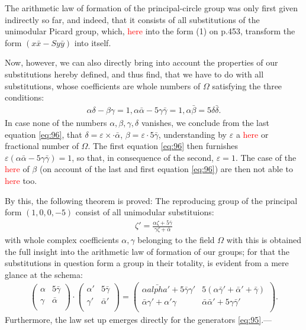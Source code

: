 The arithmetic law of formation of the principal-circle group was only first given indirectly so far, and indeed, that it consists of all substitutions of the unimodular Picard group, which, \textcolor{red}{here} into the form (1) on p.453, transform the form $(x\bar{x}-Sy\bar{y})$ into itself.

Now, however, we can also directly bring into account the properties of our substitutions hereby defined, and thus find, that we have to do with all substitutions, whose coefficients are whole numbers of $\Omega$ satisfying the three conditions:
\begin{align}\label{eq:96}
    \alpha\delta-\beta\gamma=1, \alpha\bar{\alpha}-5\gamma\bar{\gamma}=1, \alpha\bar{\beta}=5\delta\bar{\delta}.
\end{align}
In case none of the numbers $\alpha, \beta, \gamma, \delta$ vanishes, we conclude from the last equation \ref{eq:96}, that $\delta=\varepsilon\times\cdot\bar{\alpha}$, $\beta=\varepsilon\cdot 5 \bar{\gamma}$, understanding by $\varepsilon$ a \textcolor{red}{here} or fractional number of $\Omega$. The first equation \ref{eq:96} then furnishes $\varepsilon(\alpha\bar{\alpha}-5\gamma\bar{\gamma})=1$, so that, in consequence of the second, $\varepsilon=1$. The case of the \textcolor{red}{here} of $\beta$ (on account of the last and first equation \ref{eq:96}) are then not able to \textcolor{red}{here} too.
 
By this, the following theorem is proved: The reproducing group of the principal form $(1,0,0,-5)$ consist of all unimodular substituions:
\begin{align}
    \zeta'=\frac{\alpha\zeta+5\bar{\gamma}}{\gamma\zeta+\bar{\alpha}}
   \end{align} 
with whole complex coefficients $\alpha, \gamma$ belonging to the field $\Omega$ with this is obtained the full insight into the arithmetic law of formation of our groups; for that the substitutions in question form a group in their totality, is evident from a mere glance at the schema:
\begin{align}
    \left(\begin{array}{cc}
    \alpha & 5 \bar{\gamma}\\
    \gamma & \bar{\alpha}\\
    \end{array}\right)\cdot\left(\begin{array}{cc}
    \alpha' & 5 \bar{\gamma}\\
    \gamma' & \bar{\alpha}'\\
    \end{array}\right)=\left(\begin{array}{cc}
    \alpha\bar{alpha}'+5 \bar{\gamma}\gamma' & 5(\alpha\bar{\gamma}'+\bar{\alpha}'+\bar{\gamma})\\
    \bar{\alpha}\gamma'+\alpha'\gamma & \bar{\alpha}\bar{\alpha}'+5 \gamma\bar{\gamma}'\\ 
    \end{array}\right).
\end{align}
Furthermore, the law set up emerges directly for the generators \ref{eq:95}.---

